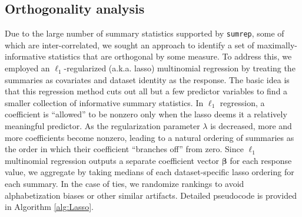 \documentclass{article}
\begin{document}
\subsection*{Orthogonality analysis}
Due to the large number of summary statistics supported by \texttt{sumrep}, some of which are inter-correlated, we sought an approach to identify a set of maximally-informative statistics that are orthogonal by some measure.
To address this, we employed an $\ell_1$-regularized (a.k.a. lasso) multinomial regression by treating the summaries as covariates and dataset identity as the response.
The basic idea is that this regression method cuts out all but a few predictor variables to find a smaller collection of informative summary statistics.
In $\ell_1$ regression, a coefficient is ``allowed'' to be nonzero only when the lasso deems it a relatively meaningful predictor.
As the regularization parameter $\lambda$ is decreased, more and more coefficients  become nonzero, leading to a natural ordering of summaries as the order in which their coefficient ``branches off'' from zero.
Since $\ell_1$ multinomial regression outputs a separate coefficient vector $\boldsymbol \beta$ for each response value, we aggregate by taking medians of each dataset-specific lasso ordering for each summary.
In the case of ties, we randomize rankings to avoid alphabetization biases or other similar artifacts.
Detailed pseudocode is provided in Algorithm \ref{alg:Lasso}.
\end{document}
